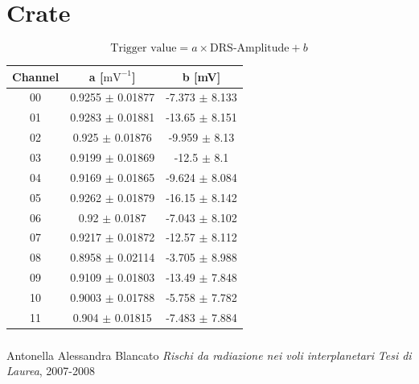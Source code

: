 \documentclass[9pt]{beamer}
\begin{document}
\section{Crate}
\begin{frame} [fragile]
\begin{equation}
\text{Trigger value} =  a \times \text{DRS-Amplitude} + b
\end{equation}

\begin{center}
\begin{tabular}{ ccc } 
 \hline
\textbf{Channel} & a  [$\text{mV}^{-1}$]& b [mV] \\ 
 \hline
 \hline
00 & 0.9255 $\pm$ 0.01877 & -7.373 $\pm$ 8.133 \\ 
01 & 0.9283 $\pm$ 0.01881 & -13.65 $\pm$ 8.151 \\
02 & 0.925   $\pm$ 0.01876 & -9.959 $\pm$ 8.13 \\
03 & 0.9199 $\pm$ 0.01869 & -12.5   $\pm$ 8.1 \\
04 & 0.9169 $\pm$ 0.01865 & -9.624 $\pm$ 8.084 \\
05 & 0.9262 $\pm$ 0.01879 & -16.15 $\pm$ 8.142 \\
06 & 0.92     $\pm$ 0.0187   & -7.043 $\pm$ 8.102 \\
07 & 0.9217 $\pm$ 0.01872 & -12.57 $\pm$ 8.112 \\
08 & 0.8958 $\pm$ 0.02114 & -3.705 $\pm$ 8.988 \\
09 & 0.9109 $\pm$ 0.01803 & -13.49 $\pm$ 7.848 \\
10 & 0.9003 $\pm$ 0.01788 & -5.758 $\pm$ 7.782 \\
11 & 0.904 $\pm$ 0.01815   & -7.483 $\pm$ 7.884 \\
  \hline
  \hline
\end{tabular}
\end{center}
\end{frame}

	

\begin{frame}
\frametitle{\refname}
   \begin{thebibliography}{9}
   \small
   

       Antonella Alessandra Blancato
      \newblock \textit{Rischi da radiazione nei voli interplanetari}
      \newblock \emph{Tesi di Laurea}, 2007-2008
      

   \end{thebibliography}
\end{frame}
\end{document}
